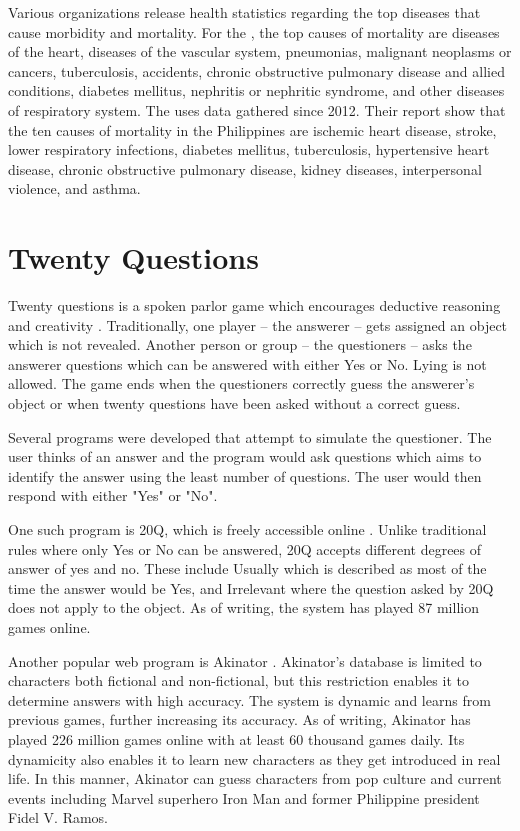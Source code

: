 Various organizations release health statistics regarding the top diseases that cause morbidity and mortality. 
For the , the top causes of mortality are diseases of the heart, diseases of the vascular system, pneumonias, malignant neoplasms or cancers, tuberculosis, accidents, chronic obstructive pulmonary disease and allied conditions, diabetes mellitus, nephritis or nephritic syndrome, and other diseases of respiratory system. 
The  uses data gathered since 2012.
Their report show that the ten causes of mortality in the Philippines are ischemic heart disease, stroke, lower respiratory infections, diabetes mellitus, tuberculosis, hypertensive heart disease, chronic obstructive pulmonary disease, kidney diseases, interpersonal violence, and asthma.

\section{Twenty Questions}
Twenty questions is a spoken parlor game which encourages deductive reasoning and creativity \cite{wiki:twenty_questions}.
Traditionally, one player -- the answerer -- gets assigned an object which is not revealed.
Another person or group -- the questioners -- asks the answerer questions which can be answered with either Yes or No. 
Lying is not allowed.
The game ends when the questioners correctly guess the answerer's object or when twenty questions have been asked without a correct guess.

Several programs were developed that attempt to simulate the questioner. 
The user thinks of an answer and the program would ask questions which aims to identify the answer using the least number of questions. The user would then respond with either "Yes" or "No".

One such program is 20Q, which is freely accessible online \cite{20q:2016}. 
Unlike traditional rules where only Yes or No can be answered, 20Q accepts different degrees of answer of yes and no.
These include Usually which is described as most of the time the answer would be Yes, and Irrelevant where the question asked by 20Q does not apply to the object.
As of writing, the system has played 87 million games online.

Another popular web program is Akinator \cite{Akinator:2016}.
Akinator's database is limited to characters both fictional and non-fictional, but this restriction enables it to determine answers with high accuracy.
The system is dynamic and learns from previous games, further increasing its accuracy.
As of writing, Akinator has played 226 million games online with at least 60 thousand games daily.
Its dynamicity also enables it to learn new characters as they get introduced in real life.
In this manner, Akinator can guess characters from pop culture and current events including Marvel superhero Iron Man and former Philippine president Fidel V. Ramos.

